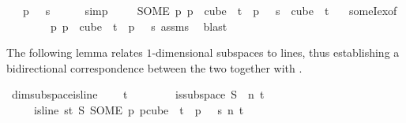 \begin{isabellebody}
\ \ {\isasymand}\ p\ {}\ {\isacharequal}{\kern0pt}\ s{\isacharparenright}{\kern0pt}\ {}{\isacharparenright}{\kern0pt}{\isachardoublequoteclose}\ \isamarkupfalse%
\ {}\ \isamarkupfalse%
\ simp\isanewline
\ \ \isamarkupfalse%
\ {}{\isacharcolon}{\kern0pt}\ {\isachardoublequoteopen}{\isacharparenleft}{\kern0pt}SOME\ p{\isachardot}{\kern0pt}\ p\ {\isasymin}\ cube\ {}\ t\ {\isasymand}\ p\ {}\ {\isacharequal}{\kern0pt}\ s{\isacharparenright}{\kern0pt}\ {\isasymin}\ cube\ {}\ t{\isachardoublequoteclose}\ \isamarkupfalse%
\ {}\ someI{\isacharunderscore}{\kern0pt}ex{\isacharbrackleft}{\kern0pt}of\isanewline
\ \ \ \ \ \ \ \ {\isachardoublequoteopen}{\isasymlambda}p{\isachardot}{\kern0pt}\ p\ {\isasymin}\ cube\ {}\ t\ {\isasymand}\ p\ {}\ {\isacharequal}{\kern0pt}\ s{\isachardoublequoteclose}{\isacharbrackright}{\kern0pt}\ assms\ \isamarkupfalse%
\ blast\isanewline
{}\isamarkupfalse%
%
\endisatagproof
{\isafoldproof}%
%
\isadelimproof
%
\endisadelimproof
%
\begin{isamarkuptext}%
The following lemma relates $1$-dimensional subspaces to lines, thus establishing a
bidirectional correspondence between the two together with
.%
\end{isamarkuptext}\isamarkuptrue%
\isamarkupfalse%
\ dim{}{\isacharunderscore}{\kern0pt}subspace{\isacharunderscore}{\kern0pt}is{\isacharunderscore}{\kern0pt}line{\isacharcolon}{\kern0pt}\ \isanewline
\ \ \ {\isachardoublequoteopen}t\ {\isachargreater}{\kern0pt}\ {}{\isachardoublequoteclose}\ \isanewline
\ \ \ \ \ {\isachardoublequoteopen}is{\isacharunderscore}{\kern0pt}subspace\ S\ {}\ n\ t{\isachardoublequoteclose}\ \isanewline
\ \ \ \ \ {\isachardoublequoteopen}is{\isacharunderscore}{\kern0pt}line\ {\isacharparenleft}{\kern0pt}{\isasymlambda}s{\isasymin}{\isacharbraceleft}{\kern0pt}{\isachardot}{\kern0pt}{\isachardot}{\kern0pt}{\isacharless}{\kern0pt}t{\isacharbraceright}{\kern0pt}{\isachardot}{\kern0pt}\ S\ {\isacharparenleft}{\kern0pt}SOME\ p{\isachardot}{\kern0pt}\ p{\isasymin}cube\ {}\ t\ {\isasymand}\ p\ {}\ {\isacharequal}{\kern0pt}\ s{\isacharparenright}{\kern0pt}{\isacharparenright}{\kern0pt}\ n\ t{\isachardoublequoteclose}\isanewline

\end{isabellebody}
